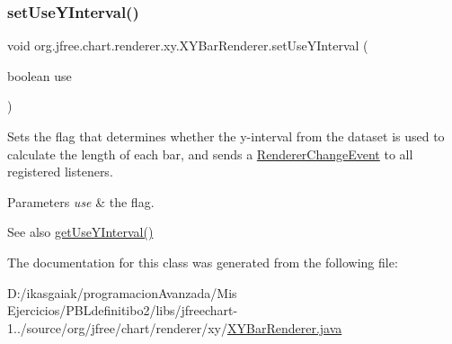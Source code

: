 \subsubsection{\texorpdfstring{set\+Use\+Y\+Interval()}{setUseYInterval()}}
{\footnotesize\ttfamily void org.\+jfree.\+chart.\+renderer.\+xy.\+X\+Y\+Bar\+Renderer.\+set\+Use\+Y\+Interval (\begin{DoxyParamCaption}\item[{boolean}]{use }\end{DoxyParamCaption})}

Sets the flag that determines whether the y-\/interval from the dataset is used to calculate the length of each bar, and sends a \mbox{\hyperlink{}{Renderer\+Change\+Event}} to all registered listeners.


\begin{DoxyParams}{Parameters}
{\em use} & the flag.\\
\hline
\end{DoxyParams}
\begin{DoxySeeAlso}{See also}
\mbox{\hyperlink{classorg_1_1jfree_1_1chart_1_1renderer_1_1xy_1_1_x_y_bar_renderer_a5202439a21afc475365e7462e9a9e660}{get\+Use\+Y\+Interval()}} 
\end{DoxySeeAlso}


The documentation for this class was generated from the following file\+:\begin{DoxyCompactItemize}
\item 
D\+:/ikasgaiak/programacion\+Avanzada/\+Mis Ejercicios/\+P\+B\+Ldefinitibo2/libs/jfreechart-\/1../source/org/jfree/chart/renderer/xy/\mbox{\hyperlink{_x_y_bar_renderer_8java}{X\+Y\+Bar\+Renderer.\+java}}\end{DoxyCompactItemize}
